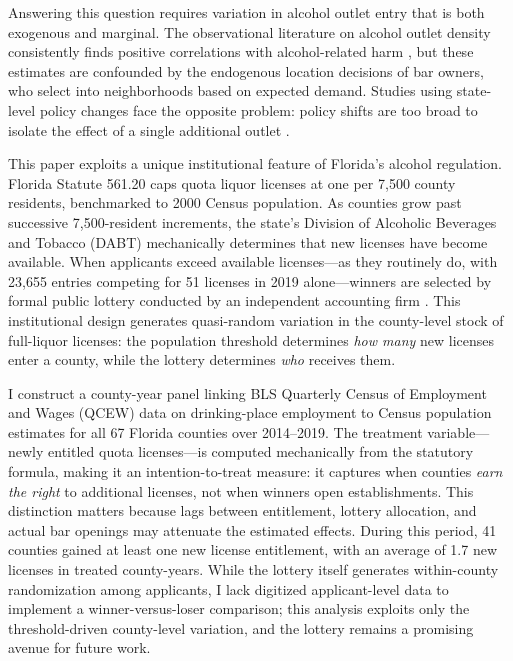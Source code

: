 \documentclass[12pt]{article}
\begin{document}
Answering this question requires variation in alcohol outlet entry that is both exogenous and marginal. The observational literature on alcohol outlet density consistently finds positive correlations with alcohol-related harm \citep{campbell2009spatial, livingston2011using, gruenewald2014regulating}, but these estimates are confounded by the endogenous location decisions of bar owners, who select into neighborhoods based on expected demand. Studies using state-level policy changes face the opposite problem: policy shifts are too broad to isolate the effect of a single additional outlet \citep{heaton2012sunday, lovenheim2014effect}.

This paper exploits a unique institutional feature of Florida's alcohol regulation. Florida Statute 561.20 caps quota liquor licenses at one per 7,500 county residents, benchmarked to 2000 Census population. As counties grow past successive 7,500-resident increments, the state's Division of Alcoholic Beverages and Tobacco (DABT) mechanically determines that new licenses have become available. When applicants exceed available licenses---as they routinely do, with 23,655 entries competing for 51 licenses in 2019 alone---winners are selected by formal public lottery conducted by an independent accounting firm \citep{florida_dbpr_2023}. This institutional design generates quasi-random variation in the county-level stock of full-liquor licenses: the population threshold determines \textit{how many} new licenses enter a county, while the lottery determines \textit{who} receives them.

I construct a county-year panel linking BLS Quarterly Census of Employment and Wages (QCEW) data on drinking-place employment to Census population estimates for all 67 Florida counties over 2014--2019. The treatment variable---newly entitled quota licenses---is computed mechanically from the statutory formula, making it an intention-to-treat measure: it captures when counties \textit{earn the right} to additional licenses, not when winners open establishments. This distinction matters because lags between entitlement, lottery allocation, and actual bar openings may attenuate the estimated effects. During this period, 41 counties gained at least one new license entitlement, with an average of 1.7 new licenses in treated county-years. While the lottery itself generates within-county randomization among applicants, I lack digitized applicant-level data to implement a winner-versus-loser comparison; this analysis exploits only the threshold-driven county-level variation, and the lottery remains a promising avenue for future work.
\end{document}
